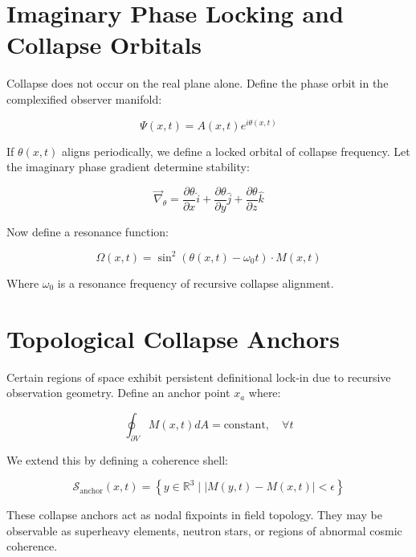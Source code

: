 \section{Imaginary Phase Locking and Collapse Orbitals}

Collapse does not occur on the real plane alone. Define the phase orbit in the complexified observer manifold:

\begin{equation}
\Psi(x,t) = A(x,t) e^{i \theta(x,t)}
\end{equation}

If $\theta(x,t)$ aligns periodically, we define a locked orbital of collapse frequency. Let the imaginary phase gradient determine stability:

\begin{equation}
\vec{\nabla}_\theta = \frac{\partial \theta}{\partial x} \hat{i} + \frac{\partial \theta}{\partial y} \hat{j} + \frac{\partial \theta}{\partial z} \hat{k}
\end{equation}

Now define a resonance function:

\begin{equation}
\Omega(x,t) = \sin^2\left(\theta(x,t) - \omega_0 t\right) \cdot M(x,t)
\end{equation}

Where $\omega_0$ is a resonance frequency of recursive collapse alignment.

\section{Topological Collapse Anchors}

Certain regions of space exhibit persistent definitional lock-in due to recursive observation geometry. Define an anchor point $x_a$ where:

\begin{equation}
\oint_{\partial V} M(x,t) dA = \text{constant}, \quad \forall t
\end{equation}

We extend this by defining a coherence shell:

\begin{equation}
\mathcal{S}_{\text{anchor}}(x,t) = \left\{ y \in \mathbb{R}^3 \mid |M(y,t) - M(x,t)| < \epsilon \right\}
\end{equation}

These collapse anchors act as nodal fixpoints in field topology. They may be observable as superheavy elements, neutron stars, or regions of abnormal cosmic coherence.



\nocite{chapter10_meta}
\printbibliography[title={Appendix I References}, keyword=chapter10]